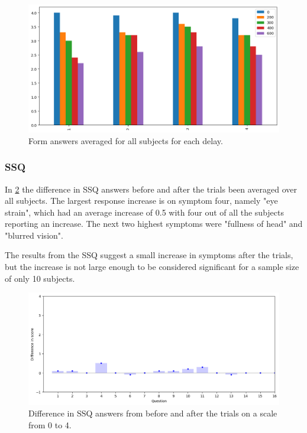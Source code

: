\documentclass[nofilelist]{cslthse-msc}
\begin{document}
\begin{figure}[!hbt]
   \centering
   \includegraphics[scale=0.6]{images/form-ans.png} 
   \caption{Form answers averaged for all subjects for each delay.}
   \label{fig:form-ans}
\end{figure}

\subsubsection{SSQ}
In \ref{fig:ssq-ans} the difference in SSQ answers before and after the trials been averaged over all subjects. The largest response increase is on symptom four, namely "eye strain", which had an average increase of  0.5 with four out of all the subjects reporting an increase. The next two highest symptoms were "fullness of head" and "blurred vision". 

The results from the SSQ suggest a small increase in  symptoms after the trials, but the increase is not large enough to be considered significant for a sample size of only 10 subjects.

\begin{figure}[!hbt]
   \centering
   \includegraphics[scale=0.6]{images/ssq-results.png} 
   \caption{Difference in SSQ answers from before and after the trials on a scale from 0 to 4.}
   \label{fig:ssq-ans}
\end{figure}
\end{document}
